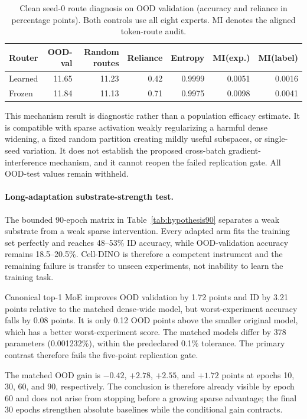 \begin{table}[t]
  \centering
  \scriptsize
  \caption{Clean seed-0 route diagnosis on OOD validation (accuracy and reliance in percentage
  points). Both controls use all eight experts. MI denotes the aligned token-route audit.}
  \label{tab:route-diagnosis}
  \begin{tabular}{lrrrrrr}
    \toprule
    Router & OOD-val & Random routes & Reliance & Entropy & MI(exp.) & MI(label) \\
    \midrule
    Learned & 11.65 & 11.23 & 0.42 & 0.9999 & 0.0051 & 0.0016 \\
    Frozen & 11.84 & 11.13 & 0.71 & 0.9975 & 0.0098 & 0.0041 \\
    \bottomrule
  \end{tabular}
\end{table}

This mechanism result is diagnostic rather than a population efficacy estimate. It is compatible
with sparse activation weakly regularizing a harmful dense widening, a fixed random partition
creating mildly useful subspaces, or single-seed variation. It does not establish the proposed
cross-batch gradient-interference mechanism, and it cannot reopen the failed replication gate. All
OOD-test values remain withheld.

\paragraph{Long-adaptation substrate-strength test.}
The bounded 90-epoch matrix in Table~\ref{tab:hypothesis90} separates a weak substrate from a weak
sparse intervention. Every adapted arm fits the training set perfectly and reaches 48--53\% ID
accuracy, while OOD-validation accuracy remains 18.5--20.5\%. Cell-DINO is therefore a competent
instrument and the remaining failure is transfer to unseen experiments, not inability to learn the
training task.

Canonical top-1 MoE improves OOD validation by 1.72 points and ID by 3.21 points relative to the
matched dense-wide model, but worst-experiment accuracy falls by 0.08 points. It is only 0.12 OOD
points above the smaller original model, which has a better worst-experiment score. The matched
models differ by 378 parameters (0.001232\%), within the predeclared 0.1\% tolerance. The primary
contrast therefore fails the five-point replication gate.

The matched OOD gain is $-0.42$, $+2.78$, $+2.55$, and $+1.72$ points at epochs 10, 30, 60, and
90, respectively. The conclusion is therefore already visible by epoch 60 and does not arise from
stopping before a growing sparse advantage; the final 30 epochs strengthen absolute baselines
while the conditional gain contracts.

